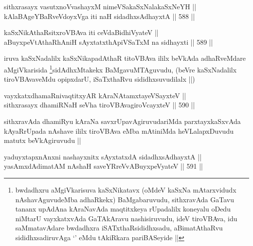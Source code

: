 \begin{shl}
sithxrasayx vasutxnoV\s vashayxM nimeVSakaSxNalakaSxNeYH || \\
kAlaBAgeYBaRveVdoyxVga iti naH sidadhxsAdhayxtA ||  588 ||  
\end{shl}



\begin{shl}
kaSxNikAthaRsitxroVBAva iti ceVdaBidhiVyateV || \\
aBuyxpeVtAthaRhAniH sAyxtatxthA\s piVSaTxM na sidhayxti ||  589 ||  
\end{shl}

\begin{artha}
iruva kaSxNadalilx kaSxNikapadAthaR titoVBAva ililx beVkAda adhaRveMdare aMgiVkarisida \footnote{bwdadhxru aMgiVkarisuva kaSxNikatavx (oMdeV kaSxNa mAtarxvidudx nAshavAguvudeMba adhaRkekx) BaMgabaruvudu, sithxravAda GaTavu tananx upAdAna kAraNavAda maqtitxkeya rUpadalilx koneyalu oDedu niMtarU vayxkatxvAda GaTAkAravu nashisiruvudu, ideV tiroVBAva, idu saMmatavAdare bwdadhxra iSATxthaRsididhxsadu, aBimatAthaRvu sididhxsadiruvAga `\stext' eMdu tAkiRkara pariBASeyide ||}sidAdhxMtakekx BaMgavuMTAguvudu, (beVre kaSxNadalilx tiroVBAvaveMdu opipxdarU, iSaTxthaRvu sididhxsuvudilalx ||)
\end{artha}


\begin{shl}
vayxkatxdhamaRnivaqtitxyAR kAraNAtamxtayeVSayxteV || \\
sithxrasayx dhamiRNaH seVha tiroVBAvagiroVcayxteV ||  590 ||  
\end{shl}

\begin{artha}
sithxravAda dhamiRyu kAraNa savxrUpavAgiruvudariMda parxtayxkaSxvAda kAyaRrUpada nAshave ililx tiroVBAva eMba mAtiniMda heVLalapxDuvudu matutx beVkAgiruvudu ||
\end{artha}


\begin{shl}
yaduyxtapxnAnxni nashayxnitx sAyxtatxdA sidadhxsAdhayxtA || \\
yasAmxdAdimatAM nAshaH saveYRreVvABuyxpeVyateV ||  591 ||  
\end{shl}

